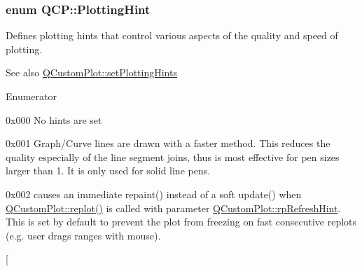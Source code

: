 \subsubsection[{\texorpdfstring{Plotting\+Hint}{PlottingHint}}]{\setlength{\rightskip}{0pt plus 5cm}enum {\bf Q\+C\+P\+::\+Plotting\+Hint}}\hypertarget{namespace_q_c_p_a5400e5fcb9528d92002ddb938c1f4ef4}{}\label{namespace_q_c_p_a5400e5fcb9528d92002ddb938c1f4ef4}
Defines plotting hints that control various aspects of the quality and speed of plotting.

\begin{DoxySeeAlso}{See also}
\hyperlink{class_q_custom_plot_a94a33cbdadbbac5934843508bcfc210d}{Q\+Custom\+Plot\+::set\+Plotting\+Hints} 
\end{DoxySeeAlso}
\begin{Desc}
\item[Enumerator]\par
\begin{description}
\item[{\em 
ph\+None\hypertarget{namespace_q_c_p_a5400e5fcb9528d92002ddb938c1f4ef4a6a4b80cab7683c4533cb04b27a862fe1}{}\label{namespace_q_c_p_a5400e5fcb9528d92002ddb938c1f4ef4a6a4b80cab7683c4533cb04b27a862fe1}
}]{\ttfamily 0x000} No hints are set \item[{\em 
ph\+Fast\+Polylines\hypertarget{namespace_q_c_p_a5400e5fcb9528d92002ddb938c1f4ef4a016e00979e96542daa49cc14c976dd02}{}\label{namespace_q_c_p_a5400e5fcb9528d92002ddb938c1f4ef4a016e00979e96542daa49cc14c976dd02}
}]{\ttfamily 0x001} Graph/\+Curve lines are drawn with a faster method. This reduces the quality especially of the line segment joins, thus is most effective for pen sizes larger than 1. It is only used for solid line pens. \item[{\em 
ph\+Immediate\+Refresh\hypertarget{namespace_q_c_p_a5400e5fcb9528d92002ddb938c1f4ef4acf4738ba3f53c15dd1ad297f512b813e}{}\label{namespace_q_c_p_a5400e5fcb9528d92002ddb938c1f4ef4acf4738ba3f53c15dd1ad297f512b813e}
}]{\ttfamily 0x002} causes an immediate repaint() instead of a soft update() when \hyperlink{class_q_custom_plot_aa4bfe7d70dbe67e81d877819b75ab9af}{Q\+Custom\+Plot\+::replot()} is called with parameter \hyperlink{class_q_custom_plot_a45d61392d13042e712a956d27762aa39a5349b4ed6366760e34653bc54613a5ad}{Q\+Custom\+Plot\+::rp\+Refresh\+Hint}. This is set by default to prevent the plot from freezing on fast consecutive replots (e.\+g. user drags ranges with mouse). \item[{\em 
}
\end{description}
\end{Desc}

